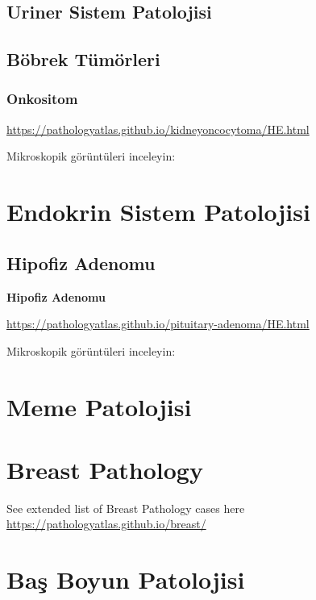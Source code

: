 \documentclass[
  letterpaper,
  DIV=11,
  numbers=noendperiod]{scrreprt}
\begin{document}
\hypertarget{uriner-sistem-patolojisi}{%
\chapter{Uriner Sistem Patolojisi}\label{uriner-sistem-patolojisi}}

\hypertarget{buxf6brek-tuxfcmuxf6rleri}{%
\chapter{Böbrek Tümörleri}\label{buxf6brek-tuxfcmuxf6rleri}}

\hypertarget{onkositom}{%
\section{Onkositom}\label{onkositom}}

\url{https://pathologyatlas.github.io/kidneyoncocytoma/HE.html}

Mikroskopik görüntüleri inceleyin:

\part{Endokrin Sistem Patolojisi}

\hypertarget{hipofiz-adenomu}{%
\chapter{Hipofiz Adenomu}\label{hipofiz-adenomu}}

\textbf{Hipofiz Adenomu}

\url{https://pathologyatlas.github.io/pituitary-adenoma/HE.html}

Mikroskopik görüntüleri inceleyin:

\part{Meme Patolojisi}

\part{Breast Pathology}

See extended list of Breast Pathology cases here
\url{https://pathologyatlas.github.io/breast/}

\part{Baş Boyun Patolojisi}
\end{document}
